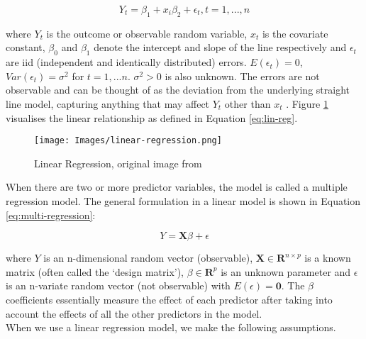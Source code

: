 \begin{equation}
    Y_t = \beta_1 + x_i\beta_2 + \epsilon_t, t = 1, ..., n
    \label{eq:lin-reg}
\end{equation}

where $Y_t$ is the outcome or observable random variable, $x_t$ is the covariate constant, $\beta_0$ and $\beta_1$ denote the intercept and slope of the line respectively and $\epsilon_t$ are iid (independent and identically distributed) errors. $E(\epsilon_t) = 0$, $Var(\epsilon_t) = \sigma^2$ for $t = 1,...n$. $\sigma^2 > 0$ is also unknown. The errors are not observable and can be thought of as the deviation from the underlying straight line model, capturing anything that may affect $Y_t$ other than $x_t$ \cite{forecasting-book}. Figure \ref{fig:lin-reg} visualises the linear relationship as defined in Equation \ref{eq:lin-reg}.

\begin{figure}[H]
\begin{center}
    \texttt{[image: Images/linear-regression.png]}
    \caption{Linear Regression, original image from \cite{forecasting-book}}
    \label{fig:lin-reg}
\end{center}
\end{figure}

When there are two or more predictor variables, the model is called a multiple regression model. The general formulation in a linear model is shown in Equation \ref{eq:multi-regression}:

\begin{equation}
    Y = \mathbf{X}\beta + \epsilon
    \label{eq:multi-regression}
\end{equation}

where $Y$ is an n-dimensional random vector (observable), $\mathbf{X} \in \mathbf{R} ^{n \times p}$ is a known matrix (often called the `design matrix'), $\beta \in \mathbf{R}^p$ is an unknown parameter and $\epsilon$ is an n-variate random vector (not observable) with $E(\epsilon) = \mathbf{0}$. The $\beta$ coefficients essentially measure the effect of each predictor after taking into account the effects of all the other predictors in the model. \\

When we use a linear regression model, we make the following assumptions.


